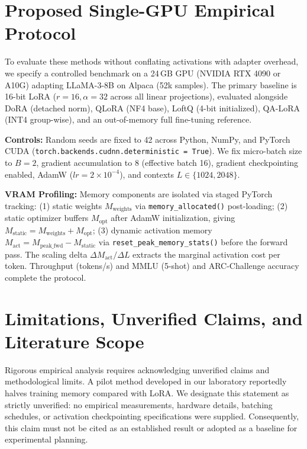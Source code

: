 \documentclass[11pt,a4paper]{article}
\begin{document}
\section{Proposed Single-GPU Empirical Protocol}

To evaluate these methods without conflating activations with adapter overhead, we specify a controlled benchmark on a 24\,GB GPU (NVIDIA RTX 4090 or A10G) adapting LLaMA-3-8B on Alpaca (52k samples). The primary baseline is 16-bit LoRA ($r=16, \alpha=32$ across all linear projections), evaluated alongside DoRA (detached norm), QLoRA (NF4 base), LoftQ (4-bit initialized), QA-LoRA (INT4 group-wise), and an out-of-memory full fine-tuning reference.

\textbf{Controls:} Random seeds are fixed to 42 across Python, NumPy, and PyTorch CUDA (\texttt{torch.backends.cudnn.deterministic = True}). We fix micro-batch size to $B = 2$, gradient accumulation to 8 (effective batch 16), gradient checkpointing enabled, AdamW ($lr = 2 \times 10^{-4}$), and contexts $L \in \{1024, 2048\}$.

\textbf{VRAM Profiling:} Memory components are isolated via staged PyTorch tracking: (1) static weights $M_{\text{weights}}$ via \texttt{memory\_allocated()} post-loading; (2) static optimizer buffers $M_{\text{opt}}$ after AdamW initialization, giving $M_{\text{static}} = M_{\text{weights}} + M_{\text{opt}}$; (3) dynamic activation memory $M_{\text{act}} = M_{\text{peak\_fwd}} - M_{\text{static}}$ via \texttt{reset\_peak\_memory\_stats()} before the forward pass. The scaling delta $\Delta M_{\text{act}} / \Delta L$ extracts the marginal activation cost per token. Throughput (tokens/s) and MMLU (5-shot) and ARC-Challenge accuracy complete the protocol.

\section{Limitations, Unverified Claims, and Literature Scope}

Rigorous empirical analysis requires acknowledging unverified claims and methodological limits. A pilot method developed in our laboratory reportedly halves training memory compared with LoRA. We designate this statement as strictly unverified: no empirical measurements, hardware details, batching schedules, or activation checkpointing specifications were supplied. Consequently, this claim must not be cited as an established result or adopted as a baseline for experimental planning.
\end{document}
